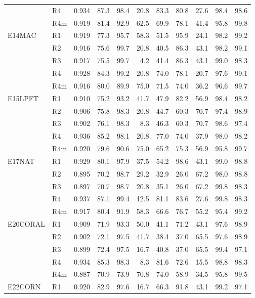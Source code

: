 \begin{table}[h]
\begin{tabular}{@{}llrrrrrrrrr@{}}
 & R4 & 0.934 & 87.3 & 98.4 & 20.8 & 83.3 & 80.8 & 27.6 & 98.4 & 98.6 \\
 & R4m & 0.919 & 81.4 & 92.9 & 62.5 & 69.9 & 78.1 & 41.4 & 95.8 & 99.8 \\
\addlinespace
E14MAC & R1 & 0.919 & 77.3 & 95.7 & 58.3 & 51.5 & 95.9 & 24.1 & 98.2 & 99.2 \\
 & R2 & 0.916 & 75.6 & 99.7 & 20.8 & 40.5 & 86.3 & 43.1 & 98.2 & 99.1 \\
 & R3 & 0.917 & 75.5 & 99.7 & 4.2 & 41.4 & 86.3 & 43.1 & 99.0 & 98.3 \\
 & R4 & 0.928 & 84.3 & 99.2 & 20.8 & 74.0 & 78.1 & 20.7 & 97.6 & 99.1 \\
 & R4m & 0.916 & 80.0 & 89.9 & 75.0 & 71.5 & 74.0 & 36.2 & 96.6 & 99.7 \\
\addlinespace
E15LPFT & R1 & 0.910 & 75.2 & 93.2 & 41.7 & 47.9 & 82.2 & 56.9 & 98.4 & 98.2 \\
 & R2 & 0.906 & 75.8 & 98.3 & 20.8 & 44.7 & 60.3 & 70.7 & 97.4 & 98.9 \\
 & R3 & 0.902 & 76.1 & 98.3 & 8.3 & 46.3 & 60.3 & 70.7 & 98.6 & 97.4 \\
 & R4 & 0.936 & 85.2 & 98.1 & 20.8 & 77.0 & 74.0 & 37.9 & 98.0 & 98.2 \\
 & R4m & 0.920 & 79.6 & 90.6 & 75.0 & 65.2 & 75.3 & 56.9 & 95.8 & 99.7 \\
\addlinespace
E17NAT & R1 & 0.929 & 80.1 & 97.9 & 37.5 & 54.2 & 98.6 & 43.1 & 99.0 & 98.8 \\
 & R2 & 0.895 & 70.2 & 98.7 & 29.2 & 32.9 & 26.0 & 67.2 & 98.0 & 98.8 \\
 & R3 & 0.897 & 70.7 & 98.7 & 20.8 & 35.1 & 26.0 & 67.2 & 99.8 & 98.3 \\
 & R4 & 0.937 & 87.1 & 99.4 & 12.5 & 81.1 & 83.6 & 27.6 & 99.8 & 98.3 \\
 & R4m & 0.917 & 80.4 & 91.9 & 58.3 & 66.6 & 76.7 & 55.2 & 95.4 & 99.2 \\
\addlinespace
E20CORAL & R1 & 0.909 & 71.9 & 93.3 & 50.0 & 41.1 & 71.2 & 43.1 & 97.6 & 98.9 \\
 & R2 & 0.902 & 72.1 & 97.5 & 41.7 & 38.4 & 37.0 & 65.5 & 97.6 & 98.9 \\
 & R3 & 0.899 & 72.4 & 97.5 & 16.7 & 40.8 & 37.0 & 65.5 & 99.4 & 97.1 \\
 & R4 & 0.934 & 85.3 & 98.3 & 8.3 & 81.6 & 72.6 & 15.5 & 98.8 & 98.3 \\
 & R4m & 0.887 & 70.9 & 73.9 & 70.8 & 74.0 & 58.9 & 34.5 & 95.8 & 99.5 \\
\addlinespace
E22CORN & R1 & 0.920 & 82.9 & 97.6 & 16.7 & 66.3 & 91.8 & 43.1 & 99.2 & 97.1 \\

\end{tabular}
\end{table}
